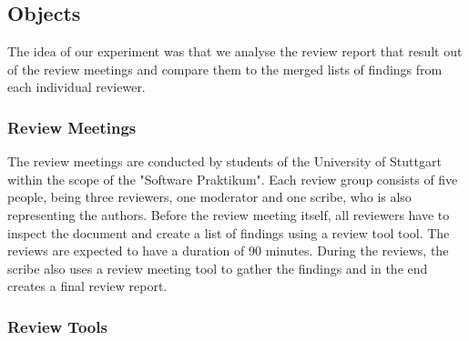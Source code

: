 \subsection{Objects}

The idea of our experiment was that we analyse the review report that result out of the review meetings and compare them to the merged lists of findings from each individual reviewer.

\subsubsection{Review Meetings}

The review meetings are conducted by students of the University of Stuttgart within the scope of the "Software Praktikum". Each review group consists of five people, being three reviewers, one moderator and one scribe, who is also representing the authors. Before the review meeting itself, all reviewers have to inspect the document and create a list of findings using a review tool \cite{TODO:revager Thommy} tool. The reviews are expected to have a duration of 90 minutes. During the reviews, the scribe also uses a review meeting tool to gather the findings and in the end creates a final review report.

\subsubsection{Review Tools}

